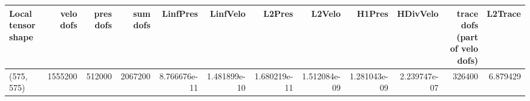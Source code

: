 \begin{tabular}{lrrrrrrrrrrr}
\toprule
Local tensor shape &  velo dofs &  pres dofs &  sum dofs &     LinfPres &     LinfVelo &       L2Pres &       L2Velo &       H1Pres &     HDivVelo &  trace dofs (part of velo dofs) &  L2Trace \\
\midrule
        (575, 575) &    1555200 &     512000 &   2067200 & 8.766676e-11 & 1.481899e-10 & 1.680219e-11 & 1.512084e-09 & 1.281043e-09 & 2.239747e-07 &                          326400 & 6.879429 \\
\bottomrule
\end{tabular}
